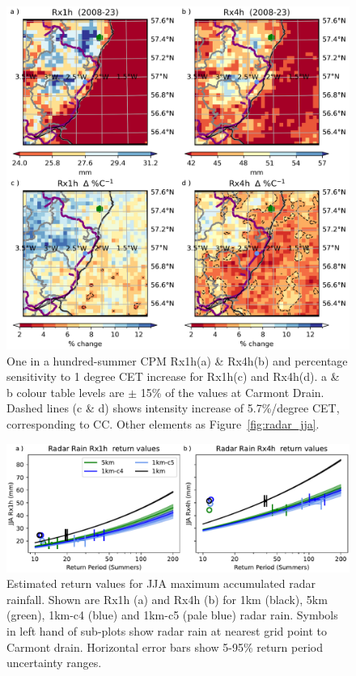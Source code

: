 \documentclass[11pt,a4paper]{article}
\begin{document}
\begin{figure}
	\centering
	\includegraphics[width=1\linewidth]{cpm_intensity_delta}
	\caption{One in a hundred-summer CPM Rx1h(a) \& Rx4h(b) and percentage sensitivity to 1 degree CET increase for Rx1h(c) and Rx4h(d).  a \& b colour table levels are $\pm$ 15\% of the values at Carmont Drain. Dashed lines (c \& d) shows intensity increase of 5.7\%/degree CET, corresponding to CC. Other elements as Figure~\ref{fig:radar_jja}.  }
	\label{fig:map_intensity}
\end{figure}

\begin{figure}
	\centering
	\includegraphics[width=\linewidth]{radar_return_prds}
	\caption{Estimated return values for  JJA maximum accumulated radar rainfall. Shown are Rx1h (a) and Rx4h (b) for 1km  (black),  5km (green), 1km-c4 (blue) and 1km-c5 (pale blue) radar rain. Symbols in left hand of sub-plots show radar rain at nearest grid point to Carmont drain. Horizontal error bars show 5-95\% return period uncertainty ranges. }
	\label{fig:radar_rtn_prd}
\end{figure}
\end{document}
